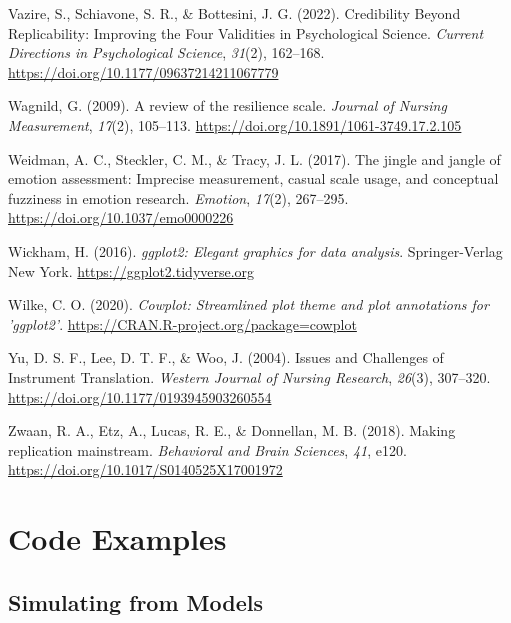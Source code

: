 \documentclass[
  man]{apa7}
\newlength{\cslhangindent}
\newenvironment{CSLReferences}[2] %
 {\begin{list}{}{%
  \setlength{\itemindent}{0pt}
  \setlength{\leftmargin}{0pt}
  \setlength{\parsep}{0pt}
  \ifodd #1
   \setlength{\leftmargin}{\cslhangindent}
   \setlength{\itemindent}{-1\cslhangindent}
  \fi
  \setlength{\itemsep}{#2\baselineskip}}}
 {\end{list}}
\begin{document}
\begin{CSLReferences}{1}{0}
Vazire, S., Schiavone, S. R., \& Bottesini, J. G. (2022). Credibility Beyond Replicability: Improving the Four Validities in Psychological Science. \emph{Current Directions in Psychological Science}, \emph{31}(2), 162--168. \url{https://doi.org/10.1177/09637214211067779}

Wagnild, G. (2009). A review of the resilience scale. \emph{Journal of Nursing Measurement}, \emph{17}(2), 105--113. \url{https://doi.org/10.1891/1061-3749.17.2.105}

Weidman, A. C., Steckler, C. M., \& Tracy, J. L. (2017). The jingle and jangle of emotion assessment: Imprecise measurement, casual scale usage, and conceptual fuzziness in emotion research. \emph{Emotion}, \emph{17}(2), 267--295. \url{https://doi.org/10.1037/emo0000226}

Wickham, H. (2016). \emph{ggplot2: Elegant graphics for data analysis}. Springer-Verlag New York. \url{https://ggplot2.tidyverse.org}

Wilke, C. O. (2020). \emph{Cowplot: Streamlined plot theme and plot annotations for 'ggplot2'}. \url{https://CRAN.R-project.org/package=cowplot}

Yu, D. S. F., Lee, D. T. F., \& Woo, J. (2004). Issues and Challenges of Instrument Translation. \emph{Western Journal of Nursing Research}, \emph{26}(3), 307--320. \url{https://doi.org/10.1177/0193945903260554}

Zwaan, R. A., Etz, A., Lucas, R. E., \& Donnellan, M. B. (2018). Making replication mainstream. \emph{Behavioral and Brain Sciences}, \emph{41}, e120. \url{https://doi.org/10.1017/S0140525X17001972}

\end{CSLReferences}

\newpage

\appendix


\section{Code Examples}\label{code-examples}

\subsection{Simulating from Models}\label{simulating-from-models}
\end{document}
